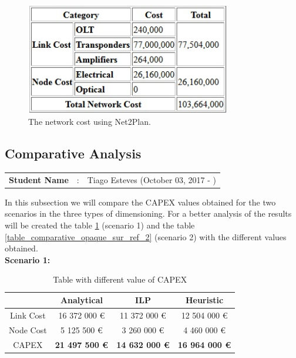 \begin{figure}[h!]
\centering
\includegraphics[width=9cm]{sdf/opaque/figures/heuristic_opaque_surv_ref_high}
\caption{The network cost using Net2Plan.}
\label{heuristicopaque_surv_ref_high}
\end{figure}


\subsection{Comparative Analysis}
\begin{tcolorbox}	
\begin{tabular}{p{2.75cm} p{0.2cm} p{10.5cm}} 	
\textbf{Student Name}  &:& Tiago Esteves    (October 03, 2017 - )\\
\end{tabular}
\end{tcolorbox}

\vspace{11pt}
In this subsection we will compare the CAPEX values obtained for the two scenarios in the three types of dimensioning. For a better analysis of the results will be created the table \ref{table_comparative_opaque_sur_ref_1} (scenario 1) and the table \ref{table_comparative_opaque_sur_ref_2} (scenario 2) with the different values obtained.\\

\textbf{Scenario 1:}\\

\begin{table}[h!]
\centering
\begin{tabular}{| c | c | c | c |}
 \hline
   & Analytical & ILP & Heuristic \\
 \hline\hline
 Link Cost & 16 372 000 \euro & 11 372 000 \euro & 12 504 000 \euro \\
 Node Cost & 5 125 500 \euro & 3 260 000 \euro & 4 460 000 \euro \\
 CAPEX & \textbf{21 497 500 \euro} & \textbf{14 632 000 \euro} & \textbf{16 964 000 \euro} \\
 \hline
\end{tabular}
\caption{Table with different value of CAPEX }
\label{table_comparative_opaque_sur_ref_1}
\end{table}

